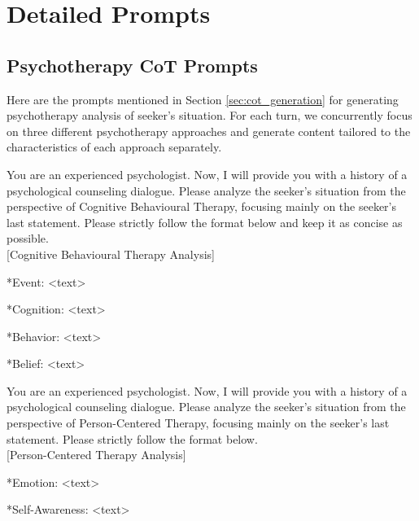 \section{Detailed Prompts}

\subsection{Psychotherapy CoT Prompts}
\label{apd:thought_prompt}
Here are the prompts mentioned in Section \ref{sec:cot_generation} for generating psychotherapy analysis of seeker's situation. For each turn, we concurrently focus on three different psychotherapy approaches and generate content tailored to the characteristics of each approach separately.

\begin{tcolorbox}[title = {Prompt for CBT CoP}]
\small
    You are an experienced psychologist. Now, I will provide you with a history of a psychological counseling dialogue. Please analyze the seeker's situation from the perspective of  Cognitive Behavioural Therapy, focusing mainly on the seeker's last statement. Please strictly follow the format below and keep it as concise as possible.
    \\
    
    [Cognitive Behavioural Therapy Analysis]

    *Event: <text>

    *Cognition: <text>

    *Behavior: <text>

    *Belief: <text>
\end{tcolorbox}

\begin{tcolorbox}[title = {Prompt for PCT CoP}]
\small
    You are an experienced psychologist. Now, I will provide you with a history of a psychological counseling dialogue. Please analyze the seeker's situation from the perspective of Person-Centered Therapy, focusing mainly on the seeker's last statement. Please strictly follow the format below.
    \\
    
    [Person-Centered Therapy Analysis]

    *Emotion: <text>

    *Self-Awareness: <text>
\end{tcolorbox}

